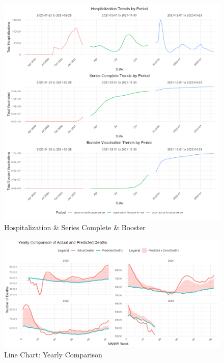 \documentclass[
  letterpaper,
  DIV=11,
  numbers=noendperiod]{scrartcl}
\begin{document}
\begin{figure}[H]

{\centering \includegraphics{../docs/stacked.png}

}

\caption{Hospitalization \& Series Complete \& Booster}

\end{figure}%
\begin{figure}[H]

{\centering \includegraphics{../docs/yearly_comparison_of_actual_and_predicted_deaths.png}

}

\caption{Line Chart: Yearly Comparison}

\end{figure}%
\end{document}
